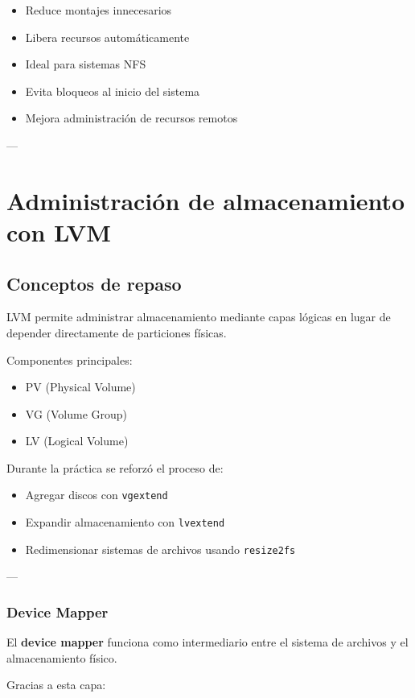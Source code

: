 \documentclass[11pt, letterpaper]{article}
\begin{document}
\begin{itemize}
\item Reduce montajes innecesarios
\item Libera recursos automáticamente
\item Ideal para sistemas NFS
\item Evita bloqueos al inicio del sistema
\item Mejora administración de recursos remotos
\end{itemize}

---
\section{Administración de almacenamiento con LVM}
\label{sec:orge6792eb}

\subsection{Conceptos de repaso}
\label{sec:org3c25c54}

LVM permite administrar almacenamiento mediante capas lógicas en lugar de depender directamente de particiones físicas.

Componentes principales:

\begin{itemize}
\item PV (Physical Volume)
\item VG (Volume Group)
\item LV (Logical Volume)
\end{itemize}

Durante la práctica se reforzó el proceso de:

\begin{itemize}
\item Agregar discos con \texttt{vgextend}
\item Expandir almacenamiento con \texttt{lvextend}
\item Redimensionar sistemas de archivos usando \texttt{resize2fs}
\end{itemize}

---
\subsubsection{Device Mapper}
\label{sec:org02170fc}

El \textbf{device mapper} funciona como intermediario entre el sistema de archivos y el almacenamiento físico.

Gracias a esta capa:
\end{document}
